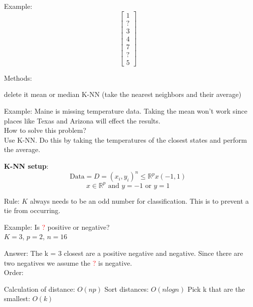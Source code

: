 Example:
\[
    \begin{bmatrix}
        1 \\
        ? \\
        3 \\
        4 \\
        7 \\
        ? \\
        5
    \end{bmatrix}
\] 

Methods:
\begin{outline}[enumerate]
    \1 delete it 
    \1 mean or median 
    \1 K-NN (take the nearest neighbors and their average)
\end{outline}

Example: Maine is missing temperature data. Taking the mean won't work since places like Texas and Arizona will effect the results. \\

How to solve this problem? \\
Use K-NN. Do this by taking the temperatures of the closest states and perform the average. 

\textbf{K-NN setup}: 
\[
    \textrm{Data} = D ={(x_i,y_i)}^n \leq \mathbb{R}^px(-1,1)
\]
\[
    x\in \mathbb{R}^p \textrm{ and } y=-1 \textrm{ or } y=1
\]

Rule:
$K$ always needs to be an odd number for classification. This is to prevent a tie from occurring.

Example: Is \textcolor{red}{?} positive or negative? \\
$K = 3$, $p = 2$, $n = 16$


Answer: The k = 3 closest are a positive negative and negative. Since there are two negatives we assume the \textcolor{red}{?} is negative. \\

Order:
\begin{outline}
    \1 Calculation of distance: $O(np)$
    \1 Sort distances: $O(n log n)$
    \1 Pick k that are the smallest: $O(k)$
\end{outline}

